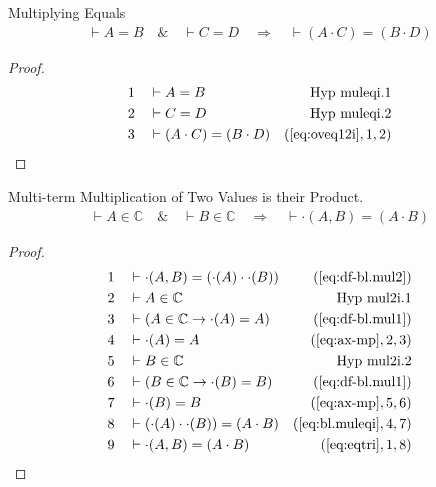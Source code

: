\begin{lemma} {Multiplying Equals}
\begin{align}
\vdash A = B\quad\&\quad \vdash C = D\quad\Rightarrow\quad \vdash ( A \cdot C )
    = ( B \cdot D )\label{eq:bl.muleqi}\tag{bl.muleqi}
\end{align}
\end{lemma}


\begin{proof}
\begin{align}
  1 &&  & \vdash A = B&\text{Hyp~muleqi.1}\notag%
  \\ 2 &&  & \vdash C = D&\text{Hyp~muleqi.2}\notag%
  \\ 3 &&  & \vdash ( A \cdot C ) = ( B \cdot D
     )&(\mbox{\ref{eq:oveq12i}},1,2)\notag
\end{align}
\end{proof}

\begin{lemma} {Multi-term Multiplication of Two Values is
their Product.}
\begin{align}
\vdash A \in \mathbb{C}\quad\&\quad \vdash B \in
    \mathbb{C}\quad\Rightarrow\quad \vdash \cdot( A , B ) = ( A \cdot B
    )\label{eq:bl.mul2i}\tag{bl.mul2i}
\end{align}
\end{lemma}


\begin{proof}
\begin{align}
  1 &&  & \vdash \cdot( A , B ) = ( \cdot( A ) \cdot \cdot( B )
     )&(\mbox{\ref{eq:df-bl.mul2}})\notag
  \\ 2 &&  & \vdash A \in \mathbb{C}&\text{Hyp~mul2i.1}\notag%
  \\ 3 &&  & \vdash ( A \in \mathbb{C} \rightarrow \cdot( A ) = A
     )&(\mbox{\ref{eq:df-bl.mul1}})\notag
  \\ 4 &&  & \vdash \cdot( A ) = A&(\mbox{\ref{eq:ax-mp}},2,3)\notag
  \\ 5 &&  & \vdash B \in \mathbb{C}&\text{Hyp~mul2i.2}\notag%
  \\ 6 &&  & \vdash ( B \in \mathbb{C} \rightarrow \cdot( B ) = B
     )&(\mbox{\ref{eq:df-bl.mul1}})\notag
  \\ 7 &&  & \vdash \cdot( B ) = B&(\mbox{\ref{eq:ax-mp}},5,6)\notag
  \\ 8 &&  & \vdash ( \cdot( A ) \cdot \cdot( B ) ) = ( A \cdot B
     )&(\mbox{\ref{eq:bl.muleqi}},4,7)\notag
  \\ 9 &&  & \vdash \cdot( A , B ) = ( A \cdot B
     )&(\mbox{\ref{eq:eqtri}},1,8)\notag
\end{align}
\end{proof}

